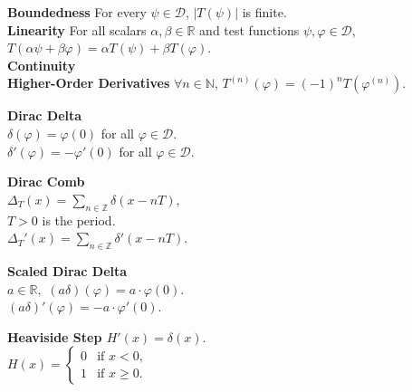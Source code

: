 \documentclass[8pt]{article}
\begin{document}
\noindent \textbf{Boundedness} For every $\psi \in \mathcal{D}$, $|T(\psi)|$ is finite. \\
\noindent \textbf{Linearity} For all scalars $\alpha, \beta \in \mathbb{R}$ and test functions $\psi, \varphi \in \mathcal{D}$,
$
	T(\alpha \psi + \beta \varphi) = \alpha T(\psi) + \beta T(\varphi).
$ \\
\noindent \textbf{Continuity} \\ \noindent{}
\noindent \textbf{Higher-Order Derivatives} $\forall n \in \mathbb{N}$, $T^{(n)}(\varphi) = (-1)^n T(\varphi^{(n)})$. \\ \vspace*{-30px}
\noindent
\begin{minipage}[t]{0.24\textwidth}
	\textbf{Dirac Delta}\\
	$\delta(\varphi) = \varphi(0)$ for all $\varphi \in \mathcal{D}.$\\
	$\delta'(\varphi) = -\varphi'(0)$ for all $\varphi \in \mathcal{D}.$
\end{minipage}
\hfill
\begin{minipage}[t]{0.24\textwidth}
	\textbf{Dirac Comb}\\
	$\Delta_T(x) = \sum_{n \in \mathbb{Z}} \delta(x - nT),$\\
	$T > 0$ is the period. \\
	$\Delta_T'(x) = \sum_{n \in \mathbb{Z}} \delta'(x - nT).$
\end{minipage}
\hfill
\begin{minipage}[t]{0.24\textwidth}
	\textbf{Scaled Dirac Delta}\\
	$a \in \mathbb{R},$ $(a\delta)(\varphi) = a \cdot \varphi(0).$ \\
	$(a\delta)'(\varphi) = -a \cdot \varphi'(0).$
\end{minipage}
\hfill
\begin{minipage}[t]{0.24\textwidth}
	\small
	\textbf{Heaviside Step $H'(x) = \delta(x).$}\\
	$H(x) =
		\begin{cases}
			0 & \text{if } x < 0,    \\
			1 & \text{if } x \geq 0.
		\end{cases}$ \\

\end{minipage}\\ \vfill
\end{document}
